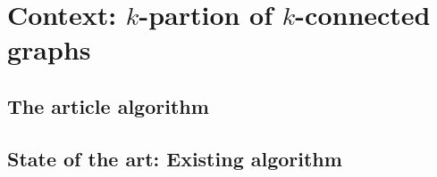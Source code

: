 \section{Context: $k$-partion of $k$-connected graphs}

\subsection{The article algorithm}

\subsection{State of the art: Existing algorithm}


